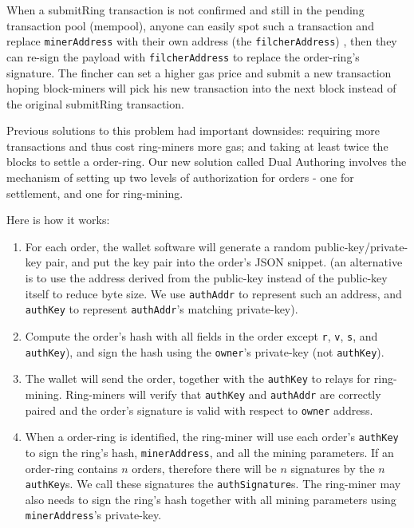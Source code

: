 \documentclass[UTF8,nofonts]{article}
\begin{document}
\begin{multicols}{2}
When a submitRing transaction is not confirmed and still in the pending transaction pool (mempool), anyone can easily spot such a transaction and replace \verb|minerAddress| with their own address (the \verb|filcherAddress|) , then they can re-sign the payload with \verb|filcherAddress| to replace the order-ring's signature. The fincher can set a higher gas price and submit a new transaction hoping block-miners will pick his new transaction into the next block instead of the original submitRing transaction.

Previous solutions to this problem had important downsides: requiring more transactions and thus cost ring-miners more gas; and taking at least twice the blocks to settle a order-ring.  Our new solution called Dual Authoring\cite{dualauthor} involves the mechanism of setting up two levels of authorization for orders - one for settlement, and one for ring-mining.

Here is how it works:

\begin{enumerate}

	\item For each order, the wallet software will generate a random public-key/private-key pair, and put the key pair into the order's JSON snippet. (an alternative is to use the address derived from the public-key instead of the public-key itself to reduce byte size. We use \verb|authAddr| to represent such an address, and \verb|authKey| to represent \verb|authAddr|'s matching private-key).

	\item Compute the order's hash with all fields in the order except \verb|r|, \verb|v|, \verb|s|, and \verb|authKey|), and sign the hash using the \verb|owner|'s private-key (not \verb|authKey|).

	\item The wallet will send the order, together with the \verb|authKey| to  relays for ring-mining. Ring-miners will verify that \verb|authKey| and \verb|authAddr| are correctly paired and the order's signature is valid with respect to \verb|owner| address.

	\item When a order-ring is identified, the ring-miner will use each order's \verb|authKey| to sign the ring's hash, \verb|minerAddress|, and all the mining parameters. If an order-ring contains $n$ orders, therefore there will be $n$ signatures by the $n$ \verb|authKey|s. We call these signatures the \verb|authSignature|s. The ring-miner may also needs to sign the ring's hash together with all mining parameters using \verb|minerAddress|'s private-key.


\end{enumerate}
\end{multicols}
\end{document}
